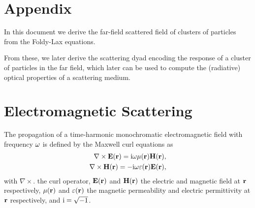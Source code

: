 

\section*{Appendix}

In this document we derive the far-field scattered field of clusters of particles from the Foldy-Lax equations. 


From these, we later derive the scattering dyad encoding the response of a cluster of particles in the far field, which later can be used to compute the (radiative) optical properties of a scattering medium. 

\section{Electromagnetic Scattering}
\label{sec:vri}
The propagation of a time-harmonic monochromatic electromagnetic field with frequency $\omega$ is defined by the Maxwell curl equations as
\begin{align}
\nabla\times \mathbf{E}(\mathbf{r}) = \text{i} \omega \mu(\mathbf{r}) \mathbf{H}(\mathbf{r}), \nonumber \\
\nabla\times \mathbf{H}(\mathbf{r}) = -\text{i} \omega \varepsilon(\mathbf{r}) \mathbf{E}(\mathbf{r}),
\label{eq:maxwell}
\end{align}
%
with $\nabla\times .$ the curl operator, $\mathbf{E}(\mathbf{r})$ and $\mathbf{H}(\mathbf{r})$ the electric and magnetic field at $\mathbf{r}$ respectively, $\mu(\mathbf{r})$ and $\varepsilon(\mathbf{r})$ the magnetic permeability and electric permittivity at $\mathbf{r}$ respectively, and $\text{i}=\sqrt{-1}$.

